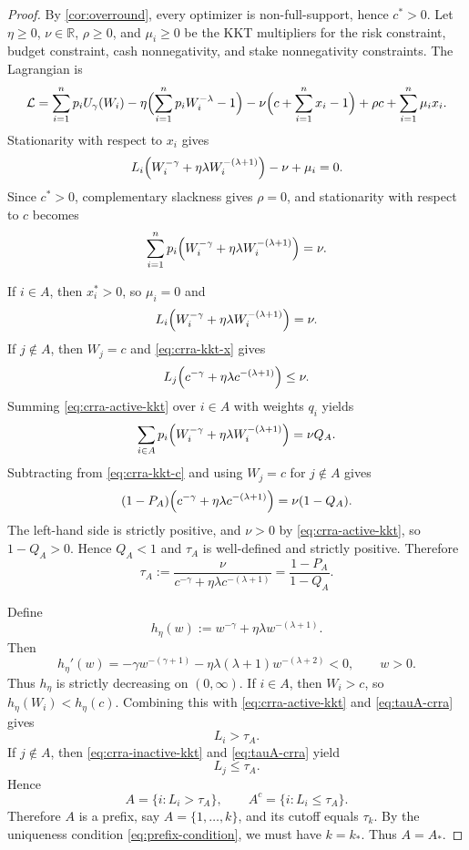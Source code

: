 \documentclass[11pt]{article}
\theoremstyle{definition}
\theoremstyle{remark}
\newcommand{\R}{\mathbb{R}}
\newcommand{\1}{\mathbf{1}}
\begin{document}
\begin{proof}
By \cref{cor:overround}, every optimizer is non-full-support, hence $c^*>0$. Let $\eta\ge 0$, $\nu\in\R$, $\rho\ge 0$, and $\mu_i\ge 0$ be the KKT multipliers for the risk constraint, budget constraint, cash nonnegativity, and stake nonnegativity constraints. The Lagrangian is
\[
\mathcal L
=
\sum_{i=1}^n p_iU_\gamma(W_i)
-\eta\Bigl(\sum_{i=1}^n p_iW_i^{-\lambda}-1\Bigr)
-\nu\Bigl(c+\sum_{i=1}^n x_i-1\Bigr)
+\rho c+\sum_{i=1}^n \mu_i x_i.
\]
Stationarity with respect to $x_i$ gives
\begin{equation}
\label{eq:crra-kkt-x}
L_i\Bigl(W_i^{-\gamma}+\eta\lambda W_i^{-(\lambda+1)}\Bigr)-\nu+\mu_i=0.
\end{equation}
Since $c^*>0$, complementary slackness gives $\rho=0$, and stationarity with respect to $c$ becomes
\begin{equation}
\label{eq:crra-kkt-c}
\sum_{i=1}^n p_i\Bigl(W_i^{-\gamma}+\eta\lambda W_i^{-(\lambda+1)}\Bigr)=\nu.
\end{equation}

If $i\in A$, then $x_i^*>0$, so $\mu_i=0$ and
\begin{equation}
\label{eq:crra-active-kkt}
L_i\Bigl(W_i^{-\gamma}+\eta\lambda W_i^{-(\lambda+1)}\Bigr)=\nu.
\end{equation}
If $j\notin A$, then $W_j=c$ and \eqref{eq:crra-kkt-x} gives
\begin{equation}
\label{eq:crra-inactive-kkt}
L_j\Bigl(c^{-\gamma}+\eta\lambda c^{-(\lambda+1)}\Bigr)\le \nu.
\end{equation}
Summing \eqref{eq:crra-active-kkt} over $i\in A$ with weights $q_i$ yields
\[
\sum_{i\in A} p_i\Bigl(W_i^{-\gamma}+\eta\lambda W_i^{-(\lambda+1)}\Bigr)=\nu Q_A.
\]
Subtracting from \eqref{eq:crra-kkt-c} and using $W_j=c$ for $j\notin A$ gives
\[
(1-P_A)\Bigl(c^{-\gamma}+\eta\lambda c^{-(\lambda+1)}\Bigr)=\nu(1-Q_A).
\]
The left-hand side is strictly positive, and $\nu>0$ by \eqref{eq:crra-active-kkt}, so $1-Q_A>0$. Hence $Q_A<1$ and $\tau_A$ is well-defined and strictly positive. Therefore
\begin{equation}
\label{eq:tauA-crra}
\tau_A:=\frac{\nu}{c^{-\gamma}+\eta\lambda c^{-(\lambda+1)}}=\frac{1-P_A}{1-Q_A}.
\end{equation}

Define
\[
h_\eta(w):=w^{-\gamma}+\eta\lambda w^{-(\lambda+1)}.
\]
Then
\[
h_\eta'(w)
=-\gamma w^{-(\gamma+1)}-\eta\lambda(\lambda+1)w^{-(\lambda+2)}<0,
\qquad w>0.
\]
Thus $h_\eta$ is strictly decreasing on $(0,\infty)$. If $i\in A$, then $W_i>c$, so $h_\eta(W_i)<h_\eta(c)$. Combining this with \eqref{eq:crra-active-kkt} and \eqref{eq:tauA-crra} gives
\[
L_i>\tau_A.
\]
If $j\notin A$, then \eqref{eq:crra-inactive-kkt} and \eqref{eq:tauA-crra} yield
\[
L_j\le \tau_A.
\]
Hence
\[
A=\{i:L_i>\tau_A\},
\qquad
A^c=\{i:L_i\le \tau_A\}.
\]
Therefore $A$ is a prefix, say $A=\{1,\dots,k\}$, and its cutoff equals $\tau_k$. By the uniqueness condition \eqref{eq:prefix-condition}, we must have $k=k_*$. Thus $A=A_*$.
\end{proof}
\end{document}

